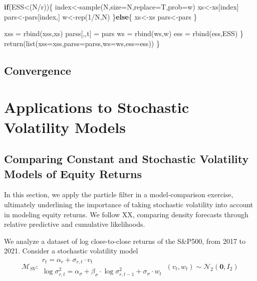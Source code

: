 \documentclass[
]{book}
\newenvironment{Shaded}{\begin{snugshade}}{\end{snugshade}}
\newcommand{\AttributeTok}[1]{\textcolor[rgb]{0.77,0.63,0.00}{#1}}
\newcommand{\ControlFlowTok}[1]{\textcolor[rgb]{0.13,0.29,0.53}{\textbf{#1}}}
\newcommand{\DecValTok}[1]{\textcolor[rgb]{0.00,0.00,0.81}{#1}}
\newcommand{\FunctionTok}[1]{\textcolor[rgb]{0.00,0.00,0.00}{#1}}
\newcommand{\NormalTok}[1]{#1}
\newcommand{\OtherTok}[1]{\textcolor[rgb]{0.56,0.35,0.01}{#1}}
\newcommand{\SpecialCharTok}[1]{\textcolor[rgb]{0.00,0.00,0.00}{#1}}
\theoremstyle{break}
\theoremstyle{nonumberplain}
\begin{document}
\begin{Shaded}
\begin{Highlighting}[]
    \ControlFlowTok{if}\NormalTok{(ESS}\SpecialCharTok{\textless{}}\NormalTok{(N}\SpecialCharTok{/}\NormalTok{r))\{}
\NormalTok{      index}\OtherTok{\textless{}{-}}\FunctionTok{sample}\NormalTok{(N,}\AttributeTok{size=}\NormalTok{N,}\AttributeTok{replace=}\NormalTok{T,}\AttributeTok{prob=}\NormalTok{w)}
\NormalTok{      xs}\OtherTok{\textless{}{-}}\NormalTok{xs[index]}
\NormalTok{      pars}\OtherTok{\textless{}{-}}\NormalTok{pars[index,]}
\NormalTok{      w}\OtherTok{\textless{}{-}}\FunctionTok{rep}\NormalTok{(}\DecValTok{1}\SpecialCharTok{/}\NormalTok{N,N)}
\NormalTok{    \}}\ControlFlowTok{else}\NormalTok{\{}
\NormalTok{      xs}\OtherTok{\textless{}{-}}\NormalTok{xs}
\NormalTok{      pars}\OtherTok{\textless{}{-}}\NormalTok{pars}
\NormalTok{    \}}
    
    
\NormalTok{    xss         }\OtherTok{=} \FunctionTok{rbind}\NormalTok{(xss,xs)}
\NormalTok{    parss[,,t]  }\OtherTok{=}\NormalTok{ pars }
\NormalTok{    ws          }\OtherTok{=} \FunctionTok{rbind}\NormalTok{(ws,w)}
\NormalTok{    ess         }\OtherTok{=} \FunctionTok{rbind}\NormalTok{(ess,ESS)}
\NormalTok{  \}}
  \FunctionTok{return}\NormalTok{(}\FunctionTok{list}\NormalTok{(}\AttributeTok{xss=}\NormalTok{xss,}\AttributeTok{parss=}\NormalTok{parss,}\AttributeTok{ws=}\NormalTok{ws,}\AttributeTok{ess=}\NormalTok{ess))}
\NormalTok{\}}
\end{Highlighting}
\end{Shaded}

\section{Convergence}\label{pf_converg}

\chapter{Applications to Stochastic Volatility Models}
\section{Comparing Constant and Stochastic Volatility Models of Equity Returns}

In this section, we apply the particle filter in a model-comparison
exercise, ultimately underlining the importance of taking stochastic
volatility into account in modeling equity returns. We follow XX,
comparing density forecasts through relative predictive and cumulative
likelihoods.

We analyze a dataset of log close-to-close returns of the S\&P500, from
2017 to 2021. Consider a stochastic volatility model \[
\mathcal{M}_{SV}:\begin{array}{lc}
r_{t}=\alpha_{r}+\sigma_{r,t}\cdot v_{t}\\
\log\sigma_{r,t}^{2}=\alpha_{\sigma}+\beta_{\sigma}\cdot\log\sigma_{r,t-1}^{2}+\sigma_{\sigma}\cdot w_{t}
\end{array}\ (v_{t},w_{t})\sim\mathcal{N}_{2}(\boldsymbol{0},I_{2})
\]
\end{document}
